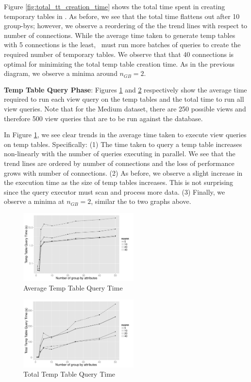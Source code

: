 Figure \ref{fig:total_tt_creation_time} shows the total time spent in creating
temporary tables in \SeeDB. As before, we see that the total time
flattens out after 10 group-bys; however, we observe a reordering of the the
trend lines with respect to number of connections. While the average time taken
to generate temp tables with 5 connections is the least, \SeeDB\ must run more
batches of queries to create the required number of temporary tables. We observe
that that 40 connections is optimal for minimizing the total temp table creation
time. As in the previous diagram, we observe a minima around $n_{GB}=2$.

{\bf Temp Table Query Phase}: Figures \ref{fig:avg_tt_query_time} and
\ref{fig:total_tt_query_time} respectively show the average time required to run
each view query on the temp tables and the total time to run all view queries.
Note that for the Medium dataset, there are 250 possible views and therefore 500
view queries that are to be run against the database.

In Figure \ref{fig:avg_tt_query_time}, we see clear trends in  the average time
taken to execute view queries on temp tables. Specifically: (1) The time taken
to query a temp table increases non-linearly with the number of queries
executing in parallel. We see that the trend lines are ordered by number of
connections and the loss of performance grows with number of connections. (2) As
before, we observe a slight increase in the execution time as the size of temp
tables increases. This is not surprising since the query executor must scan and
process more data. (3) Finally, we observe a minima at $n_{GB}=2$, similar the to
two graphs above.


\begin{figure}[h]
  \centering
    \includegraphics[width=6cm]{Images/mult_gb_tt_query_single.pdf}
  \caption{Average Temp Table Query Time}
  \label{fig:avg_tt_query_time}
\end{figure}

\begin{figure}[h]
  \centering
    \includegraphics[width=6cm]{Images/mult_gb_tt_query_total.pdf}
     \caption{Total Temp Table Query Time} 
       \label{fig:total_tt_query_time}
\end{figure}

